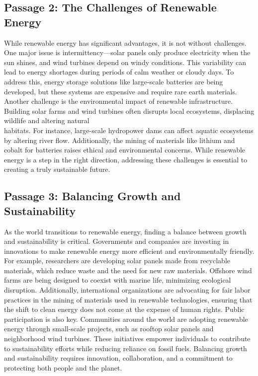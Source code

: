 \documentclass[12pt]{article}
\begin{document}
\subsection*{Passage 2: The Challenges of Renewable Energy}

While renewable energy has significant advantages, it is not without challenges. One major issue is intermittency—solar panels only produce electricity when the sun shines, and wind turbines depend on windy conditions. This variability can lead to energy shortages during periods of calm weather or cloudy days. To address this, energy storage solutions like large-scale batteries are being developed, but these systems are expensive and require rare earth materials. Another challenge is the environmental impact of renewable infrastructure. Building solar farms and wind turbines often disrupts local ecosystems, displacing wildlife and altering natural \\habitats. For instance, large-scale hydropower dams can affect aquatic ecosystems by altering river flow. Additionally, the mining of materials like lithium and cobalt for batteries raises ethical and environmental concerns. While renewable energy is a step in the right direction, addressing these challenges is essential to creating a truly sustainable future.
\newpage
\subsection*{Passage 3: Balancing Growth and Sustainability}

As the world transitions to renewable energy, finding a balance between growth and sustainability is critical. Governments and companies are investing in innovations to make renewable energy more efficient and environmentally friendly. For example, researchers are developing solar panels made from recyclable materials, which reduce waste and the need for new raw materials. Offshore wind farms are being designed to coexist with marine life, minimizing ecological disruption. Additionally, international organizations are advocating for fair labor practices in the mining of materials used in renewable technologies, ensuring that the shift to clean energy does not come at the expense of human rights. Public participation is also key. Communities around the world are adopting renewable energy through small-scale projects, such as rooftop solar panels and neighborhood wind turbines. These initiatives empower individuals to contribute to sustainability efforts while reducing reliance on fossil fuels. Balancing growth and sustainability requires innovation, collaboration, and a commitment to protecting both people and the planet.
\end{document}
